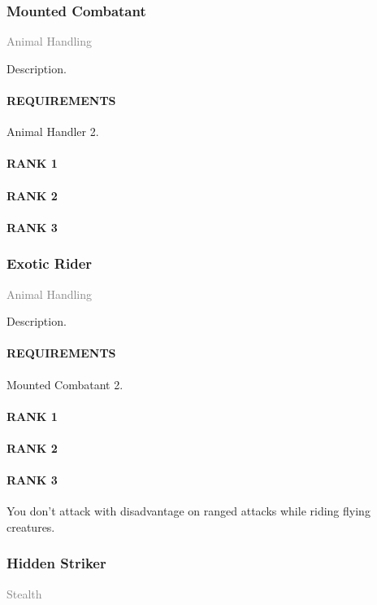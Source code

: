 \subsubsection{Mounted Combatant} \label{tal::mountedcombatant} %
\small{\textcolor{gray}{Animal Handling}}

\normalsize
Description.
\paragraph{REQUIREMENTS} Animal Handler 2.
\paragraph{RANK 1} 
\paragraph{RANK 2} 
\paragraph{RANK 3} 

\subsubsection{Exotic Rider} \label{tal::exoticrider} %
\small{\textcolor{gray}{Animal Handling}}

\normalsize
Description.
\paragraph{REQUIREMENTS} Mounted Combatant 2.
\paragraph{RANK 1} 
\paragraph{RANK 2} 
\paragraph{RANK 3} You don't attack with disadvantage on ranged attacks while riding flying creatures.

\subsubsection{Hidden Striker} \label{tal::hiddenstriker} %
\small{\textcolor{gray}{Stealth}}

